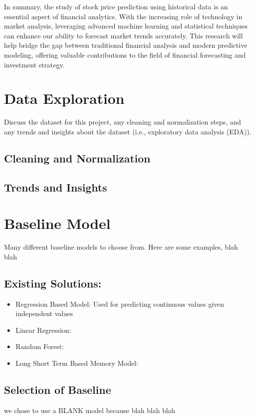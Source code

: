 \documentclass[conference]{IEEEtran}
\begin{document}
In summary, the study of stock price prediction using historical data is an essential aspect of financial analytics. With the increasing role of technology in market analysis, leveraging advanced machine learning and statistical techniques can enhance our ability to forecast market trends accurately. This research will help bridge the gap between traditional financial analysis and modern predictive modeling, offering valuable contributions to the field of financial forecasting and investment strategy.


\section{Data Exploration}

 Discuss the dataset for this project, any cleaning and normalization steps, and any trends and insights about the dataset (i.e., exploratory data analysis (EDA)).

 \subsection{Cleaning and Normalization}

 \subsection{Trends and Insights}

\section{Baseline Model}

Many different baseline models to choose from.  Here are some examples, blah blah

\subsection{Existing Solutions: }
\begin{itemize}
\item{Regression Based Model: }
Used for predicting continuous values given independent values
\item{Linear Regression: }

\item{Random Forest: }
\item{Long Short Term Based Memory Model: }

\end{itemize}

\subsection{Selection of Baseline}
we chose to use a BLANK model because blah blah blah
\end{document}
